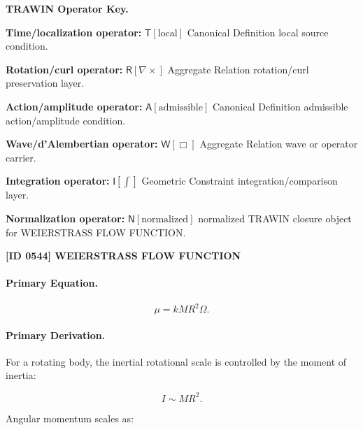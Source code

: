 \par\vspace{0.45\baselineskip}
\noindent\begin{minipage}[t]{\linewidth}
\begingroup
\small
\raggedright
\textbf{TRAWIN Operator Key.}\par
\noindent\textbf{Time/localization operator:} $\mathsf{T}\!\left[\mathrm{local}\right]$ Canonical Definition local source condition.\par
\noindent\textbf{Rotation/curl operator:} $\mathsf{R}\!\left[\nabla\times\right]$ Aggregate Relation rotation/curl preservation layer.\par
\noindent\textbf{Action/amplitude operator:} $\mathsf{A}\!\left[\mathrm{admissible}\right]$ Canonical Definition admissible action/amplitude condition.\par
\noindent\textbf{Wave/d'Alembertian operator:} $\mathsf{W}\!\left[\Box\right]$ Aggregate Relation wave or operator carrier.\par
\noindent\textbf{Integration operator:} $\mathsf{I}\!\left[\int\right]$ Geometric Constraint integration/comparison layer.\par
\noindent\textbf{Normalization operator:} $\mathsf{N}\!\left[\mathrm{normalized}\right]$ normalized TRAWIN closure object for WEIERSTRASS FLOW FUNCTION.\par
\endgroup
\end{minipage}

\clearpage
\noindent\textbf{[ID 0544] WEIERSTRASS FLOW FUNCTION}\par
\vspace{0.35em}
\paragraph{Primary Equation.}
\begin{equation}
\mu
=
kMR^2\Omega .
\end{equation}

\paragraph{Primary Derivation.}
For a rotating body, the inertial rotational scale is controlled by the moment of inertia:

\begin{equation}
I
\sim
MR^2 .
\end{equation}

Angular momentum scales as:

